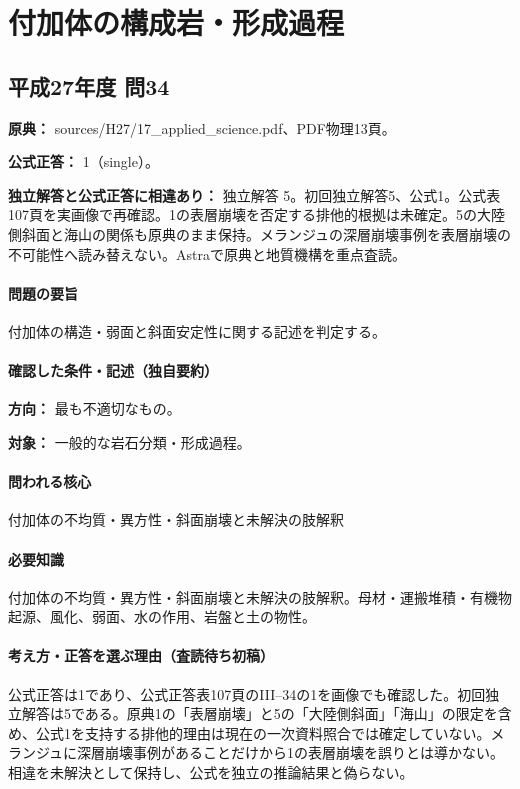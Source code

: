 \section{付加体の構成岩・形成過程}

\subsection{平成27年度 問34}
\label{q:h27-reg-applied-34}

\noindent\textbf{原典：} sources/H27/17\_applied\_science.pdf、PDF物理13頁。

\textbf{公式正答：} 1（single）。

\par\textbf{独立解答と公式正答に相違あり：} 独立解答 5。初回独立解答5、公式1。公式表107頁を実画像で再確認。1の表層崩壊を否定する排他的根拠は未確定。5の大陸側斜面と海山の関係も原典のまま保持。メランジュの深層崩壊事例を表層崩壊の不可能性へ読み替えない。Astraで原典と地質機構を重点査読。

\paragraph{問題の要旨} 付加体の構造・弱面と斜面安定性に関する記述を判定する。

\paragraph{確認した条件・記述（独自要約）}\mbox{}\par

\noindent\textbf{方向：} 最も不適切なもの。\par

\noindent\textbf{対象：} 一般的な岩石分類・形成過程。\par

\paragraph{問われる核心} 付加体の不均質・異方性・斜面崩壊と未解決の肢解釈

\paragraph{必要知識} 付加体の不均質・異方性・斜面崩壊と未解決の肢解釈。母材・運搬堆積・有機物起源、風化、弱面、水の作用、岩盤と土の物性。

\paragraph{考え方・正答を選ぶ理由（査読待ち初稿）} 公式正答は1であり、公式正答表107頁のIII–34の1を画像でも確認した。初回独立解答は5である。原典1の「表層崩壊」と5の「大陸側斜面」「海山」の限定を含め、公式1を支持する排他的理由は現在の一次資料照合では確定していない。メランジュに深層崩壊事例があることだけから1の表層崩壊を誤りとは導かない。相違を未解決として保持し、公式を独立の推論結果と偽らない。


